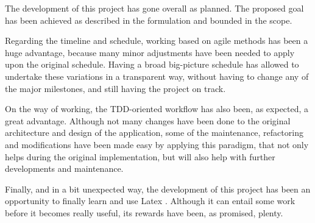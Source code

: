 The development of this project has gone overall as planned. The proposed goal has been achieved as described in the formulation and bounded in the scope.

Regarding the timeline and schedule, working based on agile methods has been a huge advantage, because many minor adjustments have been needed to apply upon the original schedule. Having a broad big-picture schedule has allowed to undertake these variations in a transparent way, without having to change any of the major milestones, and still having the project on track.

On the way of working, the TDD-oriented workflow has also been, as expected, a great advantage. Although not many changes have been done to the original architecture and design of the application, some of the maintenance, refactoring and modifications have been made easy by applying this paradigm, that not only helps during the original implementation, but will also help with further developments and maintenance.

Finally, and in a bit unexpected way, the development of this project has been an opportunity to finally learn and use Latex \cite{13}. Although it can entail some work before it becomes really useful, its rewards have been, as promised, plenty.
